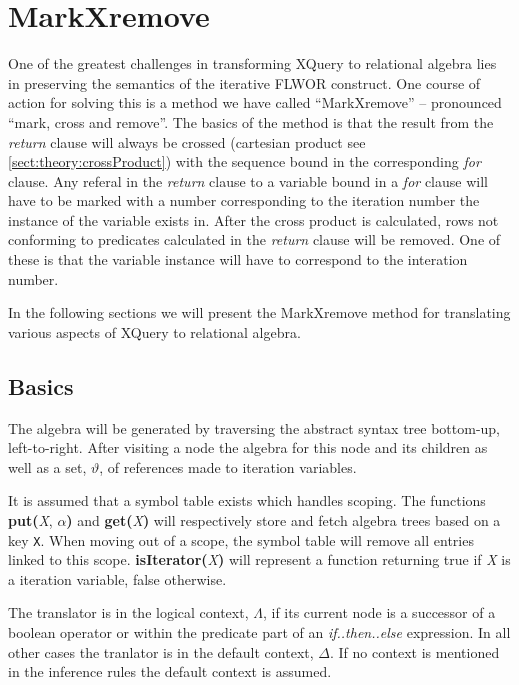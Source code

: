 \section{MarkXremove}
\label{sect:translation:markXremove}

One of the greatest challenges in transforming XQuery to relational algebra
lies in preserving the semantics of the iterative FLWOR construct. One
course of action for solving this is a method we have called ``MarkXremove'' --
pronounced ``mark, cross and remove''. The basics of the method is that the
result from the \textit{return} clause will always be crossed (cartesian product
see \ref{sect:theory:crossProduct}) with the sequence bound in the
corresponding \textit{for} clause. Any referal in the \textit{return} clause to a
variable bound in a \textit{for} clause will have to be marked with a number
corresponding to the iteration number the instance of the variable exists in.
After the cross product is calculated, rows not conforming to predicates
calculated in the \textit{return} clause will be removed. One of these is that
the variable instance will have to correspond to the interation number.

In the following sections we will present the MarkXremove method for
translating various aspects of XQuery to relational algebra.

\subsection{Basics}
The algebra will be generated by traversing the abstract syntax tree bottom-up,
left-to-right. After visiting a node the algebra for this node and its children
as well as a set, $\vartheta$, of references made to iteration variables.

It is assumed that a symbol table exists which handles scoping. The functions
\textbf{put(}\textit{X}, $\alpha$\textbf{)} and \textbf{get(}\textit{X}\textbf{)}
will respectively store and fetch algebra trees based on a key \verb!X!. When
moving out of a scope, the symbol table will remove all entries linked to this scope.
\textbf{isIterator(}\textit{X}\textbf{)} will represent a function returning
true if \textit{X} is a iteration variable, false otherwise.

The translator is in the logical context, $\Lambda$, if its current node is a
successor of a boolean operator or within the predicate part of an
\textit{if..then..else} expression. In all other cases the tranlator is in the
default context, $\Delta$. If no context is mentioned in the inference rules
the default context is assumed.

